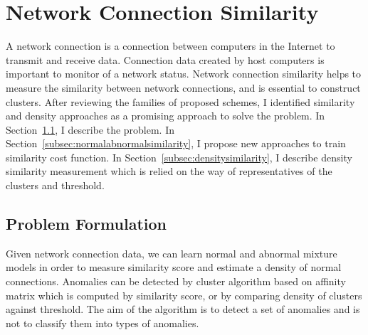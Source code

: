 \section{Network Connection Similarity}
\label{sec:connectionsimilarity}
A network connection is a connection between computers in the Internet to transmit and receive data. 
Connection data created by host computers is important to monitor of a network status.
Network connection similarity helps to measure the similarity between network connections, and is essential to construct clusters. 
After reviewing the families of proposed schemes, I identified similarity and density approaches as a promising approach to solve the problem.
\newline
In Section~\ref{subsec:problemformulation}, I describe the problem.\newline
In Section~\ref{subsec:normalabnormalsimilarity}, I propose new approaches to train similarity cost function.\newline
In Section~\ref{subsec:densitysimilarity}, I describe density similarity measurement which is relied on the way of representatives of the clusters and threshold.\newline
\subsection{Problem Formulation}
\label{subsec:problemformulation}
Given network connection data, we can learn normal and abnormal mixture models in order to measure similarity score and estimate a density of normal connections. 
Anomalies can be detected by cluster algorithm based on affinity matrix which is computed by similarity score, or by comparing density of clusters against threshold. 
The aim of the algorithm is to detect a set of anomalies and is not to classify them into types of anomalies. 

